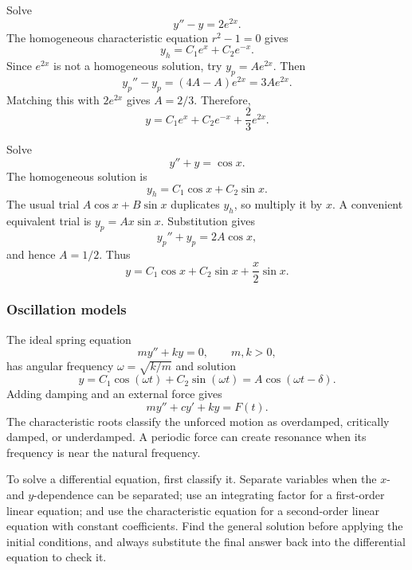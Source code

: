 \begin{eg}
    Solve
    \[
        y''-y=2e^{2x}.
    \]
    The homogeneous characteristic equation \(r^2-1=0\) gives
    \[
        y_h=C_1e^x+C_2e^{-x}.
    \]
    Since \(e^{2x}\) is not a homogeneous solution, try
    \(y_p=Ae^{2x}\).  Then
    \[
        y_p''-y_p=(4A-A)e^{2x}=3Ae^{2x}.
    \]
    Matching this with \(2e^{2x}\) gives \(A=2/3\).  Therefore,
    \[
        \boxed{y=C_1e^x+C_2e^{-x}+\frac23e^{2x}}.
    \]
\end{eg}

\begin{eg}[Resonance]
    Solve
    \[
        y''+y=\cos x.
    \]
    The homogeneous solution is
    \[
        y_h=C_1\cos x+C_2\sin x.
    \]
    The usual trial \(A\cos x+B\sin x\) duplicates \(y_h\), so multiply
    it by \(x\).  A convenient equivalent trial is
    \(y_p=Ax\sin x\).  Substitution gives
    \[
        y_p''+y_p=2A\cos x,
    \]
    and hence \(A=1/2\).  Thus
    \[
        \boxed{y=C_1\cos x+C_2\sin x+\frac{x}{2}\sin x}.
    \]
\end{eg}

\subsubsection{Oscillation models}

The ideal spring equation
\[
    my''+ky=0,
    \qquad m,k>0,
\]
has angular frequency \(\omega=\sqrt{k/m}\) and solution
\[
    y=C_1\cos(\omega t)+C_2\sin(\omega t)
     =A\cos(\omega t-\delta).
\]
Adding damping and an external force gives
\[
    my''+cy'+ky=F(t).
\]
The characteristic roots classify the unforced motion as overdamped,
critically damped, or underdamped.  A periodic force can create resonance
when its frequency is near the natural frequency.

\begin{moral}
    To solve a differential equation, first classify it.  Separate
    variables when the \(x\)- and \(y\)-dependence can be separated; use an
    integrating factor for a first-order linear equation; and use the
    characteristic equation for a second-order linear equation with
    constant coefficients.  Find the general solution before applying the
    initial conditions, and always substitute the final answer back into
    the differential equation to check it.
\end{moral}
